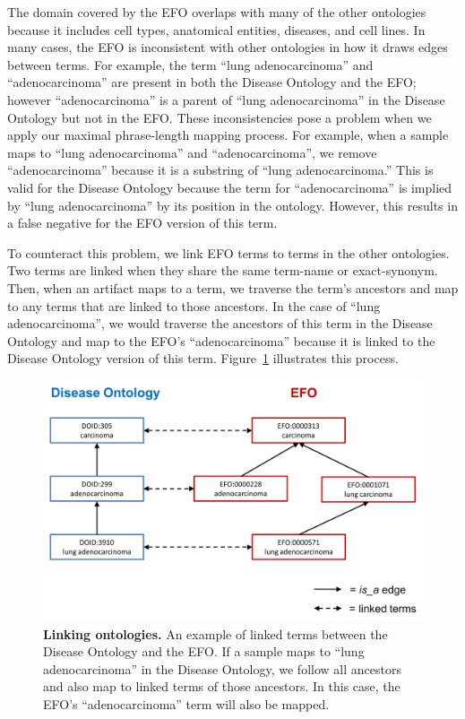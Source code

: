 The domain covered by the EFO overlaps with many of the other ontologies because it includes cell types, anatomical entities, diseases, and cell lines.  In many cases, the EFO is inconsistent with other ontologies in how it draws edges between terms.  For example, the term ``lung adenocarcinoma'' and ``adenocarcinoma'' are present in both the Disease Ontology and the EFO; however ``adenocarcinoma'' is a parent of ``lung adenocarcinoma'' in the Disease Ontology but not in the EFO.  These inconsistencies pose a problem when we apply our maximal phrase-length mapping process.   For example, when a sample maps to ``lung adenocarcinoma'' and ``adenocarcinoma'', we remove ``adenocarcinoma'' because it is a substring of ``lung adenocarcinoma.''  This is valid for the Disease Ontology because the term for ``adenocarcinoma'' is implied by ``lung adenocarcinoma'' by its position in the ontology.  However, this results in a false negative for the EFO version of this term.  

To counteract this problem, we link EFO terms to terms in the other ontologies.  Two terms are linked when they share the same term-name or exact-synonym.  Then, when an artifact maps to a term, we traverse the term's ancestors and map to any terms that are linked to those ancestors.   In the case of ``lung adenocarcinoma'', we would traverse the ancestors of this term in the Disease Ontology and map to the EFO's ``adenocarcinoma'' because it is linked to the Disease Ontology version of this term. Figure~\ref{fig:linked} illustrates this process. 

\begin{figure}[htbp]
\centering
\includegraphics[scale=0.35]{figures/linked_ontologies.png} 
\caption{\textbf{Linking ontologies.} An example of linked terms between the Disease Ontology and the EFO. If a sample maps to ``lung adenocarcinoma'' in the Disease Ontology, we follow all ancestors and also map to linked terms of those ancestors. In this case, the EFO's ``adenocarcinoma'' term will also be mapped.}
\label{fig:linked}
\end{figure}


